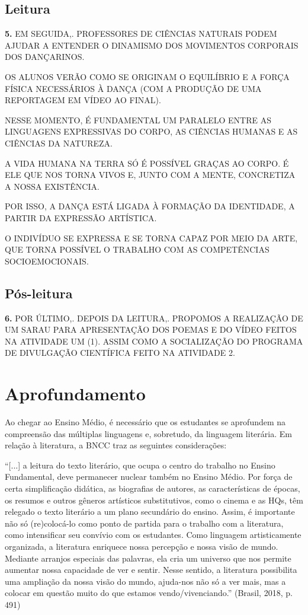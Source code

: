 \documentclass{extarticle}
\begin{document}
\subsection{Leitura}

\textbf{5.} EM SEGUIDA,. PROFESSORES DE CIÊNCIAS NATURAIS PODEM AJUDAR A
ENTENDER O DINAMISMO DOS MOVIMENTOS CORPORAIS DOS DANÇARINOS.
 
OS ALUNOS VERÃO COMO SE ORIGINAM O EQUILÍBRIO E A FORÇA FÍSICA
NECESSÁRIOS À DANÇA (COM A PRODUÇÃO DE UMA REPORTAGEM EM VÍDEO AO
FINAL).
 
NESSE MOMENTO, É FUNDAMENTAL UM PARALELO ENTRE AS LINGUAGENS EXPRESSIVAS
DO CORPO, AS CIÊNCIAS HUMANAS E AS CIÊNCIAS DA NATUREZA.
 
A VIDA HUMANA NA TERRA SÓ É POSSÍVEL GRAÇAS AO CORPO. É ELE QUE NOS
TORNA VIVOS E, JUNTO COM A MENTE, CONCRETIZA A NOSSA EXISTÊNCIA.~
 
POR ISSO, A DANÇA ESTÁ LIGADA À FORMAÇÃO DA IDENTIDADE, A PARTIR DA
EXPRESSÃO ARTÍSTICA.~
 
O INDIVÍDUO SE EXPRESSA E SE TORNA CAPAZ POR MEIO DA ARTE, QUE TORNA
POSSÍVEL O TRABALHO COM AS COMPETÊNCIAS SOCIOEMOCIONAIS.

\subsection{Pós-leitura}

\textbf{6.} POR ÚLTIMO,. DEPOIS DA LEITURA,. PROPOMOS A REALIZAÇÃO DE UM
SARAU PARA APRESENTAÇÃO DOS POEMAS E DO VÍDEO FEITOS NA ATIVIDADE UM
(1). ASSIM COMO A SOCIALIZAÇÃO DO PROGRAMA DE DIVULGAÇÃO CIENTÍFICA
FEITO NA ATIVIDADE 2.

\section{Aprofundamento}


Ao chegar ao Ensino Médio, é necessário que os estudantes se aprofundem
na compreensão das múltiplas linguagens e, sobretudo, da linguagem
literária. Em relação à literatura, a BNCC traz as seguintes
considerações:

``{[}...{]} a leitura do texto literário, que ocupa o centro do trabalho
no Ensino Fundamental, deve permanecer nuclear também no Ensino Médio.
Por força de certa simplificação didática, as biografias de autores, as
características de épocas, os resumos e outros gêneros artísticos
substitutivos, como o cinema e as HQs, têm relegado o texto literário a
um plano secundário do ensino. Assim, é importante não só (re)colocá-lo
como ponto de partida para o trabalho com a literatura, como
intensificar seu convívio com os estudantes. Como linguagem
artisticamente organizada, a literatura enriquece nossa percepção e
nossa visão de mundo. Mediante arranjos especiais das palavras, ela cria
um universo que nos permite aumentar nossa capacidade de ver e sentir.
Nesse sentido, a literatura possibilita uma ampliação da nossa visão do
mundo, ajuda-nos não só a ver mais, mas a colocar em questão muito do
que estamos vendo/vivenciando.'' (Brasil, 2018, p. 491)
\end{document}
